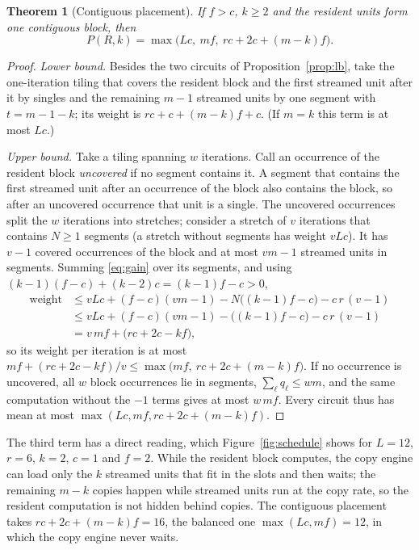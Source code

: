 \documentclass[final,5p,times,twocolumn]{elsarticle}
\newtheorem{theorem}{Theorem}
\theoremstyle{definition}
\newcommand{\Res}{R}
\newcommand{\per}{P}
\begin{document}
\begin{theorem}[Contiguous placement]\label{thm:contig}
If $f>c$, $k\ge2$ and the resident units form one contiguous block, then
\[
\per(\Res,k)=\max\bigl(Lc,\ mf,\ rc+2c+(m-k)f\bigr).
\]
\end{theorem}
\begin{proof}
\emph{Lower bound.} Besides the two circuits of Proposition~\ref{prop:lb}, take the one-iteration tiling that covers the resident block and the first streamed unit after it by singles and the remaining $m-1$ streamed units by one segment with $t=m-1-k$; its weight is $rc+c+(m-k)f+c$. (If $m=k$ this term is at most $Lc$.)

\emph{Upper bound.} Take a tiling spanning $w$ iterations. Call an occurrence of the resident block \emph{uncovered} if no segment contains it. A segment that contains the first streamed unit after an occurrence of the block also contains the block, so after an uncovered occurrence that unit is a single. The uncovered occurrences split the $w$ iterations into stretches; consider a stretch of $v$ iterations that contains $N\ge1$ segments (a stretch without segments has weight $vLc$). It has $v-1$ covered occurrences of the block and at most $vm-1$ streamed units in segments. Summing \eqref{eq:gain} over its segments, and using $(k-1)(f-c)+(k-2)c=(k-1)f-c>0$,
\begin{align*}
\text{weight} &\le vLc+(f-c)(vm-1)-N\bigl((k-1)f-c\bigr)-c\,r\,(v-1)\\
&\le vLc+(f-c)(vm-1)-\bigl((k-1)f-c\bigr)-c\,r\,(v-1)\\
&= v\,mf+\bigl(rc+2c-kf\bigr),
\end{align*}
so its weight per iteration is at most $mf+(rc+2c-kf)/v\le\max\bigl(mf,\ rc+2c+(m-k)f\bigr)$. If no occurrence is uncovered, all $w$ block occurrences lie in segments, $\sum_\ell q_\ell\le wm$, and the same computation without the $-1$ terms gives at most $w\,mf$. Every circuit thus has mean at most $\max(Lc,mf,rc+2c+(m-k)f)$.
\end{proof}

The third term has a direct reading, which Figure~\ref{fig:schedule} shows for $L=12$, $r=6$, $k=2$, $c=1$ and $f=2$. While the resident block computes, the copy engine can load only the $k$ streamed units that fit in the slots and then waits; the remaining $m-k$ copies happen while streamed units run at the copy rate, so the resident computation is not hidden behind copies. The contiguous placement takes $rc+2c+(m-k)f=16$, the balanced one $\max(Lc,mf)=12$, in which the copy engine never waits.
\end{document}
